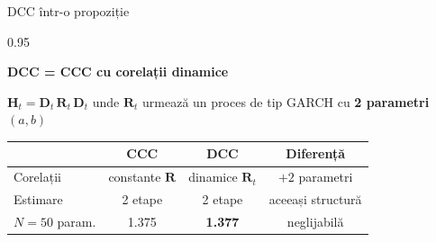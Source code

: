 \documentclass[9pt, aspectratio=169, t]{beamer}
\begin{document}
\begin{frame}{DCC într-o propoziție}
    \begin{cminipage}{0.95\textwidth}
    \vspace{1cm}
    {\Large
    \begin{center}
        \textcolor{MainBlue}{\textbf{DCC = CCC cu corelații dinamice}}
    \end{center}
    }
    \vspace{0.5cm}
    {\footnotesize
    \begin{center}
        $\mathbf{H}_t = \mathbf{D}_t\,\mathbf{R}_t\,\mathbf{D}_t$
        \qquad unde $\mathbf{R}_t$ urmează un proces de tip GARCH cu \textbf{2 parametri} $(a, b)$
    \end{center}
    \vspace{0.5cm}
    \begin{center}
        \renewcommand{\arraystretch}{1.4}
        \begin{tabular}{lccc}
            \hline
            & \textbf{CCC} & \textbf{DCC} & \textbf{Diferență} \\
            \hline
            Corelații & constante $\mathbf{R}$ & dinamice $\mathbf{R}_t$ & $+2$ parametri \\
            Estimare & 2 etape & 2 etape & aceeași structură \\
            $N = 50$ param. & 1.375 & \textbf{1.377} & neglijabilă \\
            \hline
        \end{tabular}
    \end{center}
    }
    \end{cminipage}
\end{frame}
\end{document}
